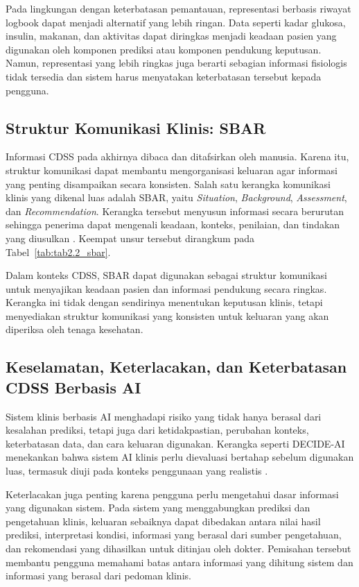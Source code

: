 Pada lingkungan dengan keterbatasan pemantauan, representasi berbasis riwayat logbook dapat menjadi alternatif yang lebih ringan. Data seperti kadar glukosa, insulin, makanan, 
dan aktivitas dapat diringkas menjadi keadaan pasien yang digunakan oleh komponen prediksi atau komponen pendukung keputusan. Namun, representasi yang lebih ringkas juga 
berarti sebagian informasi fisiologis tidak tersedia dan sistem harus menyatakan keterbatasan tersebut kepada pengguna.

\subsection{Struktur Komunikasi Klinis: SBAR}
\label{subsec:bab2-sbar}

Informasi CDSS pada akhirnya dibaca dan ditafsirkan oleh manusia. Karena itu, struktur komunikasi dapat membantu mengorganisasi keluaran agar informasi yang penting disampaikan 
secara konsisten. Salah satu kerangka komunikasi klinis yang dikenal luas adalah SBAR, yaitu \textit{Situation}, \textit{Background}, \textit{Assessment}, dan \textit{Recommendation}.
Kerangka tersebut menyusun informasi secara berurutan sehingga penerima dapat mengenali keadaan, konteks, penilaian, dan tindakan yang diusulkan \parencite{muller2018}.
Keempat unsur tersebut dirangkum pada Tabel~\ref{tab:tab2.2_sbar}.



Dalam konteks CDSS, SBAR dapat digunakan sebagai struktur komunikasi untuk menyajikan keadaan pasien dan informasi pendukung secara ringkas. Kerangka ini tidak dengan sendirinya 
menentukan keputusan klinis, tetapi menyediakan struktur komunikasi yang konsisten untuk keluaran yang akan diperiksa oleh tenaga kesehatan.

\subsection{Keselamatan, Keterlacakan, dan Keterbatasan CDSS Berbasis AI}
\label{subsec:bab2-keselamatan-cdss}

Sistem klinis berbasis AI menghadapi risiko yang tidak hanya berasal dari kesalahan prediksi, tetapi juga dari ketidakpastian, perubahan konteks, keterbatasan data, dan cara 
keluaran digunakan. Kerangka seperti DECIDE-AI menekankan bahwa sistem AI klinis perlu dievaluasi bertahap sebelum digunakan luas, termasuk diuji pada konteks penggunaan yang
realistis \parencite{vasey2022}.

Keterlacakan juga penting karena pengguna perlu mengetahui dasar informasi yang digunakan sistem. Pada sistem yang menggabungkan prediksi dan pengetahuan klinis, keluaran 
sebaiknya dapat dibedakan antara nilai hasil prediksi, interpretasi kondisi, informasi yang berasal dari sumber pengetahuan, dan rekomendasi yang dihasilkan untuk ditinjau 
oleh dokter. Pemisahan tersebut membantu pengguna memahami batas antara informasi yang dihitung sistem dan informasi yang berasal dari pedoman klinis.

